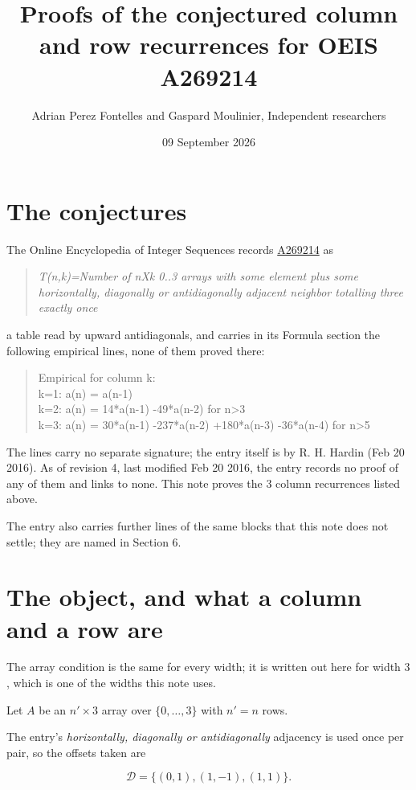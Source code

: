 \documentclass[11pt]{article}
\title{Proofs of the conjectured column and row recurrences for OEIS A269214}
\author{Adrian Perez Fontelles and Gaspard Moulinier, Independent researchers}
\date{09 September 2026}
\theoremstyle{definition}
\begin{document}
\maketitle
\section{The conjectures}

The Online Encyclopedia of Integer Sequences records \href{https://oeis.org/A269214}{A269214} as

\begin{quote}\itshape T(n,k)=Number of nXk 0..3 arrays with some element plus some horizontally, diagonally or antidiagonally adjacent neighbor totalling three exactly once\end{quote}

a table read by upward antidiagonals, and carries in its Formula section the following empirical lines, none of them proved there:

\begin{quote}\ttfamily Empirical for column k:\\
k=1: a(n) = a(n-1)\\k=2: a(n) = 14*a(n-1) -49*a(n-2) for n>3\\k=3: a(n) = 30*a(n-1) -237*a(n-2) +180*a(n-3) -36*a(n-4) for n>5\end{quote}

The lines carry no separate signature; the entry itself is by R. H. Hardin (Feb 20 2016). As of revision 4, last modified Feb 20 2016, the entry records no proof of any of them and links to none. This note proves the 3 column recurrences listed above.

The entry also carries further lines of the same blocks that this note does not settle; they are named in Section 6.

\section{The object, and what a column and a row are}

The array condition is the same for every width; it is written out here for width $3$, which is one of the widths this note uses.

Let $A$ be an $n' \times 3$ array over $\{0,\dots,3\}$ with $n' = n$ rows.

The entry's {\itshape horizontally, diagonally or antidiagonally} adjacency is used once per pair, so the offsets taken are

\[\mathcal{D} = \{(0,1), (1,-1), (1,1)\}.\]
\end{document}
